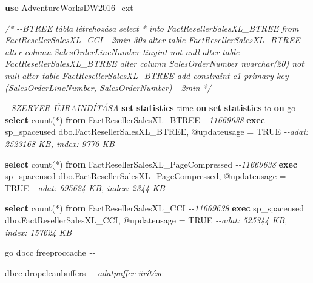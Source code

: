 \documentclass[
  magyar,
]{article}
\newenvironment{Shaded}{}{}
\newcommand{\CommentTok}[1]{\textcolor[rgb]{0.38,0.63,0.69}{\textit{#1}}}
\newcommand{\DataTypeTok}[1]{\textcolor[rgb]{0.56,0.13,0.00}{#1}}
\newcommand{\FunctionTok}[1]{\textcolor[rgb]{0.02,0.16,0.49}{#1}}
\newcommand{\KeywordTok}[1]{\textcolor[rgb]{0.00,0.44,0.13}{\textbf{#1}}}
\newcommand{\NormalTok}[1]{#1}
\newcommand{\OperatorTok}[1]{\textcolor[rgb]{0.40,0.40,0.40}{#1}}
\newcommand{\StringTok}[1]{\textcolor[rgb]{0.25,0.44,0.63}{#1}}
\begin{document}
\begin{Shaded}
\begin{Highlighting}[]
\KeywordTok{use}\NormalTok{ AdventureWorksDW2016\_ext}

\CommentTok{/*}
\CommentTok{{-}{-}BTREE tábla létrehozása}
\CommentTok{select * into FactResellerSalesXL\_BTREE from FactResellerSalesXL\_CCI {-}{-}2min 30s}
\CommentTok{alter table FactResellerSalesXL\_BTREE alter column SalesOrderLineNumber tinyint not null}
\CommentTok{alter table FactResellerSalesXL\_BTREE alter column SalesOrderNumber nvarchar(20) not null}
\CommentTok{alter table FactResellerSalesXL\_BTREE add constraint c1 primary key}
\CommentTok{(SalesOrderLineNumber, SalesOrderNumber) {-}{-}2min}
\CommentTok{*/}

\CommentTok{{-}{-}SZERVER ÚJRAINDÍTÁSA}
\KeywordTok{set} \KeywordTok{statistics} \DataTypeTok{time} \KeywordTok{on}
\KeywordTok{set} \KeywordTok{statistics}\NormalTok{ io }\KeywordTok{on}
\NormalTok{go}
\KeywordTok{select} \FunctionTok{count}\NormalTok{(}\OperatorTok{*}\NormalTok{) }\KeywordTok{from}\NormalTok{ FactResellerSalesXL\_BTREE  }\CommentTok{{-}{-}11669638}
\KeywordTok{exec}\NormalTok{ sp\_spaceused }\StringTok{\textquotesingle{}dbo.FactResellerSalesXL\_BTREE\textquotesingle{}}\NormalTok{, @updateusage }\OperatorTok{=} \StringTok{\textquotesingle{}TRUE\textquotesingle{}}
\CommentTok{{-}{-}adat: 2523168 KB, index: 9776 KB}

\KeywordTok{select} \FunctionTok{count}\NormalTok{(}\OperatorTok{*}\NormalTok{) }\KeywordTok{from}\NormalTok{ FactResellerSalesXL\_PageCompressed  }\CommentTok{{-}{-}11669638}
\KeywordTok{exec}\NormalTok{ sp\_spaceused }\StringTok{\textquotesingle{}dbo.FactResellerSalesXL\_PageCompressed\textquotesingle{}}\NormalTok{, @updateusage }\OperatorTok{=} \StringTok{\textquotesingle{}TRUE\textquotesingle{}}
\CommentTok{{-}{-}adat: 695624 KB, index: 2344 KB}

\KeywordTok{select} \FunctionTok{count}\NormalTok{(}\OperatorTok{*}\NormalTok{) }\KeywordTok{from}\NormalTok{ FactResellerSalesXL\_CCI  }\CommentTok{{-}{-}11669638}
\KeywordTok{exec}\NormalTok{ sp\_spaceused }\StringTok{\textquotesingle{}dbo.FactResellerSalesXL\_CCI\textquotesingle{}}\NormalTok{, @updateusage }\OperatorTok{=} \StringTok{\textquotesingle{}TRUE\textquotesingle{}}
\CommentTok{{-}{-}adat: 525344 KB, index: 157624 KB}

\NormalTok{go}
\NormalTok{dbcc freeproccache }\CommentTok{{-}{-}}

\NormalTok{dbcc dropcleanbuffers }\CommentTok{{-}{-} adatpuffer ürítése}


\end{Highlighting}
\end{Shaded}
\end{document}
